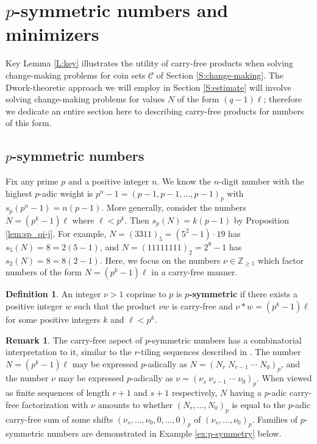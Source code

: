 \documentclass{amsart}
\numberwithin{equation}{section}
\newcommand{\Z}{\mathbb{Z}}
\newcommand{\cC}{\mathcal{C}}
\theoremstyle{plain}
\theoremstyle{definition}
\newtheorem{definition}[theorem]{Definition}
\newtheorem{remark}[theorem]{Remark}
\begin{document}
\section{\texorpdfstring{$p$}{p}-symmetric numbers and minimizers}
\label{S:symmetric}

Key Lemma \ref{L:key} illustrates the utility of carry-free products
when solving change-making problems for coin sets $\cC$ of Section \ref{S:change-making}.
The Dwork-theoretic approach we will employ
in Section \ref{S:estimate} will involve solving change-making problems
for values $N$ of the form $(q-1)\ell$;
therefore we dedicate an entire section here to describing carry-free
products for numbers of this form.

\subsection{\texorpdfstring{$p$}{p}-symmetric numbers}
\label{S:4.1} 

Fix any prime $p$ and a positive integer $n$.
We know the $n$-digit number with the highest $p$-adic weight is
$p^n-1=(p-1,p-1,\ldots,p-1)_p$ with $s_p(p^n-1)=n(p-1)$. 
More generally, consider the numbers $N=(p^k-1)\ell$ where $\ell<p^k$.
Then $s_p(N)=k(p-1)$ by Proposition \ref{lem:sp_qi-j}.
For example, $N=(3311)_5=(5^2-1)\cdot 19$ has $s_5(N)=8=2(5-1)$,
and $N=(11111111)_2=2^8-1$ has $s_2(N)=8=8(2-1)$.
Here, we focus on the numbers $\nu\in\Z_{\ge 1}$ which factor
numbers of the form $N=(p^k-1)\ell$ in a carry-free manner.

\begin{definition}\label{def:p-symmetry}
    An integer $\nu > 1$ coprime to $p$
    is \textbf{$p$-symmetric}
    if there exists a positive integer $w$ such that 
    the product $\nu w$ is carry-free
    and $\nu * w=(p^k - 1)\ell$
    for some positive integers $k$ and $\ell<p^k$.
\end{definition}

\begin{remark}
 The carry-free aspect of $p$-symmetric numbers has a combinatorial
    interpretation to it, similar to the $r$-tiling sequences described
    in \cite{SZ02c}.
    The number $N = (p^k-1)\ell$ may be expressed $p$-adically as 
    $N = (N_r \; N_{r-1} \; \cdots \; N_0)_p$,
    and the number $\nu$ may be expressed $p$-adically as
    $\nu = (\nu_s \; \nu_{s-1} \; \cdots \; \nu_0)_p$.
    When viewed as finite sequences of length $r+1$ and $s+1$
    respectively, $N$ having a $p$-adic carry-free factorization with $\nu$
    amounts to whether $(N_r, \dots, N_0)_p$ is equal to the 
    $p$-adic carry-free sum 
    of some shifts $(\nu_s,\dots,\nu_0,0,\dots,0)_p$ of $(\nu_s, \dots, \nu_0)_p$.
    Families of $p$-symmetric numbers are demonstrated in 
    Example \ref{ex:p-symmetry} below.
\end{remark}
\end{document}
